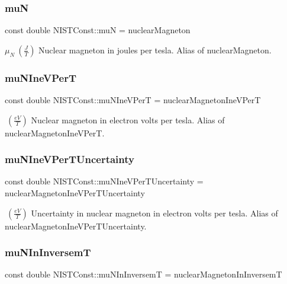 \subsubsection{\texorpdfstring{muN}{muN}}
{\footnotesize\ttfamily const double N\+I\+S\+T\+Const\+::muN = nuclear\+Magneton}

$\mu_N \ (\frac{J}{T})$ Nuclear magneton in joules per tesla. Alias of nuclear\+Magneton. \mbox{\label{group___nuclear_magneton_ga2c8a56a6542df06b37fed3b2b5444ff6}} 
\subsubsection{\texorpdfstring{mu\+N\+Ine\+V\+PerT}{muNIneVPerT}}
{\footnotesize\ttfamily const double N\+I\+S\+T\+Const\+::mu\+N\+Ine\+V\+PerT = nuclear\+Magneton\+Ine\+V\+PerT}

$ \ (\frac{eV}{T})$ Nuclear magneton in electron volts per tesla. Alias of nuclear\+Magneton\+Ine\+V\+PerT. \mbox{\label{group___nuclear_magneton_ga9dc78b16dc28b0355f5b8c71b5d7f25c}} 
\subsubsection{\texorpdfstring{mu\+N\+Ine\+V\+Per\+T\+Uncertainty}{muNIneVPerTUncertainty}}
{\footnotesize\ttfamily const double N\+I\+S\+T\+Const\+::mu\+N\+Ine\+V\+Per\+T\+Uncertainty = nuclear\+Magneton\+Ine\+V\+Per\+T\+Uncertainty}

$ \ (\frac{eV}{T})$ Uncertainty in nuclear magneton in electron volts per tesla. Alias of nuclear\+Magneton\+Ine\+V\+Per\+T\+Uncertainty. \mbox{\label{group___nuclear_magneton_ga9c4499c279614bf4bb837c9c4c74b208}} 
\subsubsection{\texorpdfstring{mu\+N\+In\+InversemT}{muNInInversemT}}
{\footnotesize\ttfamily const double N\+I\+S\+T\+Const\+::mu\+N\+In\+InversemT = nuclear\+Magneton\+In\+InversemT}

